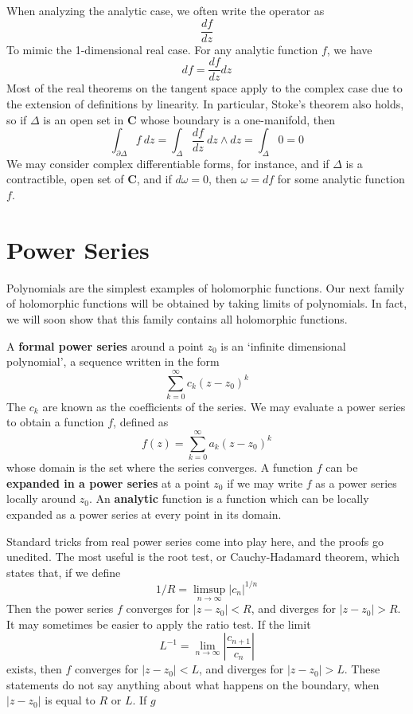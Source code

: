 When analyzing the analytic case, we often write the operator as
%
\[ \frac{df}{dz} \]
%
To mimic the 1-dimensional real case. For any analytic function $f$, we have
%
\[ df = \frac{df}{dz} dz \]
%
Most of the real theorems on the tangent space apply to the complex case due to the extension of definitions by linearity. In particular, Stoke's theorem also holds, so if $\Delta$ is an open set in $\mathbf{C}$ whose boundary is a one-manifold, then
%
\[ \int_{\partial \Delta} f\ dz = \int_\Delta \frac{df}{dz}\ dz \wedge dz = \int_\Delta 0 = 0 \]
%
We may consider complex differentiable forms, for instance, and if $\Delta$ is a contractible, open set of $\mathbf{C}$, and if $d \omega = 0$, then $\omega = df$ for some analytic function $f$.



\section{Power Series}

Polynomials are the simplest examples of holomorphic functions. Our next family of holomorphic functions will be obtained by taking limits of polynomials. In fact, we will soon show that this family contains all holomorphic functions.

\begin{definition}
    A {\bf formal power series} around a point $z_0$ is an `infinite dimensional polynomial', a sequence written in the form
    \[ \sum_{k = 0}^\infty c_k (z - z_0)^k \]
    The $c_k$ are known as the coefficients of the series. We may evaluate a power series to obtain a function $f$, defined as
    \[ f(z) = \sum_{k = 0}^\infty a_k (z - z_0)^k \]
    whose domain is the set where the series converges. A function $f$ can be {\bf expanded in a power series} at a point $z_0$ if we may write $f$ as a power series locally around $z_0$. An {\bf analytic} function is a function which can be locally expanded as a power series at every point in its domain.
\end{definition}

Standard tricks from real power series come into play here, and the proofs go unedited. The most useful is the root test, or Cauchy-Hadamard theorem, which states that, if we define
%
\[ 1/R = \limsup_{n \to \infty} |c_n|^{1/n} \]
%
Then the power series $f$ converges for $|z - z_0| < R$, and diverges for $|z - z_0| > R$. It may sometimes be easier to apply the ratio test. If the limit
%
\[ L^{-1} = \lim_{n \to \infty} \left| \frac{c_{n+1}}{c_n} \right| \]
%
exists, then $f$ converges for $|z - z_0| < L$, and diverges for $|z - z_0| > L$. These statements do not say anything about what happens on the boundary, when $|z - z_0|$ is equal to $R$ or $L$. If $g$ 

